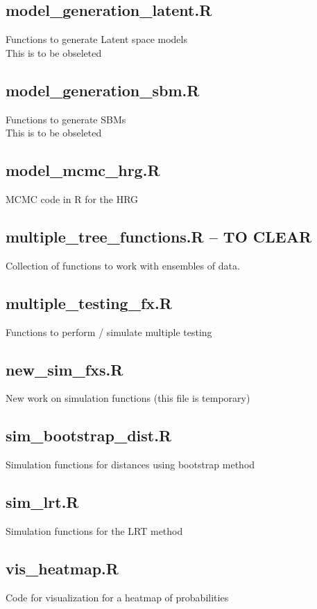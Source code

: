 \documentclass[11pt]{article}
\begin{document}
\subsection{model\_generation\_latent.R}
Functions to generate Latent space models \\
This is to be obseleted
\subsection{model\_generation\_sbm.R}
Functions to generate SBMs \\
This is to be obseleted

\subsection{model\_mcmc\_hrg.R}
MCMC code in R for the HRG

\subsection{multiple\_tree\_functions.R -- TO CLEAR}
Collection of functions to work with ensembles of data. 

\subsection{multiple\_testing\_fx.R}
Functions to perform / simulate multiple testing

\subsection{new\_sim\_fxs.R}
New work on simulation functions (this file is temporary)

\subsection{sim\_bootstrap\_dist.R}
Simulation functions for distances using bootstrap method

\subsection{sim\_lrt.R}
Simulation functions for the LRT method

\subsection{vis\_heatmap.R}
Code for visualization for a heatmap of probabilities
\end{document}
